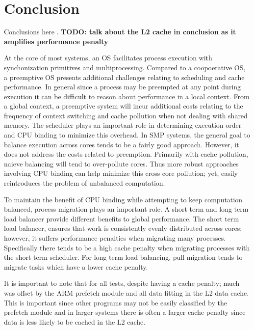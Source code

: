 \documentclass[11pt]{article}
\begin{document}
\section{Conclusion}
\label{sec:conclusion}

Conclusions here \cite{freebsd} \cite{unix}.
\textbf{TODO: talk about the L2 cache in conclusion as it amplifies performance penalty}

At the core of most systems, an OS facilitates process execution with synchonization primitives and multiprocessing.  Compared to a coopoerative OS, a preemptive OS presents additional challenges relating to scheduling and cache performance.  In general since a process may be preempted at any point during execution it can be difficult to reason about performance in a local context.  From a global context, a preemptive system will incur additional costs relating to the frequency of context switching and cache pollution when not dealing with shared memory.  The scheduler plays an important role in determining execution order and CPU binding to minimize this overhead.  In SMP systems, the general goal to balance execution across cores tends to be a fairly good approach.  However, it does not address the costs related to preemption.  Primarily with cache pollution, naieve balancing will tend to over-pollute cores.  Thus more robust approaches involving CPU binding can help minimize this cross core pollution; yet, easily reintroduces the problem of unbalanced computation.

To maintain the benefit of CPU binding while attempting to keep computation balanced, process migration plays an important role.  A short term and long term load balancer provide different benefits to global performance.  The short term load balancer, ensures that work is consistently evenly distributed across cores; however, it suffers performance penalties when migrating many processes.  Specifically there tends to be a high cache penalty when migrating processes with the short term scheduler.  For long term load balancing, pull migration tends to migrate tasks which have a lower cache penalty.


It is important to note that for all tests, despite having a cache penalty; much was offset by the ARM prefetch module and all data fitting in the L2 data cache.  This is important since other programs may not be easily classified by the prefetch module and in larger systems there is often a larger cache penalty since data is less likely to be cached in the L2 cache.
\end{document}
